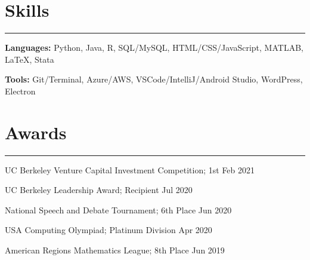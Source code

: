 \documentclass[11pt]{article}
\newcommand{\resumesection}[1]{\vspace{-0.6cm}\section*{\color{highlight}#1}\vspace{-0.3cm}\hrule\vspace{0.2cm}}
\begin{document}
\resumesection{Skills}

\textbf{Languages:} Python, Java, R, SQL/MySQL, HTML/CSS/JavaScript, MATLAB, \LaTeX, Stata \par
\textbf{Tools:} Git/Terminal, Azure/AWS, VSCode/IntelliJ/Android Studio, WordPress, Electron

\resumesection{Awards}

UC Berkeley Venture Capital Investment Competition; 1st \hfill Feb 2021\par
UC Berkeley Leadership Award; Recipient \hfill Jul 2020 \par
National Speech and Debate Tournament; 6th Place \hfill Jun 2020 \par
USA Computing Olympiad; Platinum Division \hfill Apr 2020 \par
American Regions Mathematics League; 8th Place \hfill Jun 2019 \par
\end{document}
